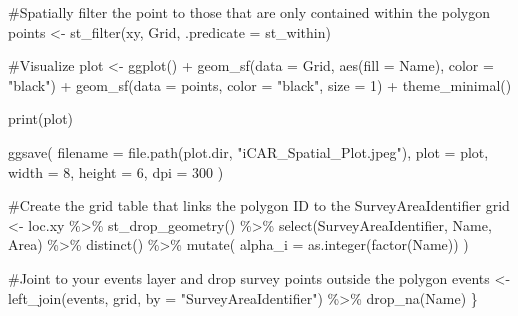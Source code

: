 \documentclass[
  letterpaper,
  DIV=11,
  numbers=noendperiod]{scrreprt}
\newenvironment{Shaded}{\begin{snugshade}}{\end{snugshade}}
\newcommand{\AttributeTok}[1]{\textcolor[rgb]{0.40,0.45,0.13}{#1}}
\newcommand{\CommentTok}[1]{\textcolor[rgb]{0.37,0.37,0.37}{#1}}
\newcommand{\DecValTok}[1]{\textcolor[rgb]{0.68,0.00,0.00}{#1}}
\newcommand{\FunctionTok}[1]{\textcolor[rgb]{0.28,0.35,0.67}{#1}}
\newcommand{\NormalTok}[1]{\textcolor[rgb]{0.00,0.23,0.31}{#1}}
\newcommand{\OtherTok}[1]{\textcolor[rgb]{0.00,0.23,0.31}{#1}}
\newcommand{\SpecialCharTok}[1]{\textcolor[rgb]{0.37,0.37,0.37}{#1}}
\newcommand{\StringTok}[1]{\textcolor[rgb]{0.13,0.47,0.30}{#1}}
\begin{document}
\begin{Shaded}
\begin{Highlighting}[]
\CommentTok{\#Spatially filter the point to those that are only contained within the polygon}
\NormalTok{points }\OtherTok{\textless{}{-}} \FunctionTok{st\_filter}\NormalTok{(xy, Grid, }\AttributeTok{.predicate =}\NormalTok{ st\_within)}

\CommentTok{\#Visualize}
\NormalTok{plot }\OtherTok{\textless{}{-}} \FunctionTok{ggplot}\NormalTok{() }\SpecialCharTok{+}
  \FunctionTok{geom\_sf}\NormalTok{(}\AttributeTok{data =}\NormalTok{ Grid, }\FunctionTok{aes}\NormalTok{(}\AttributeTok{fill =}\NormalTok{ Name), }\AttributeTok{color =} \StringTok{"black"}\NormalTok{) }\SpecialCharTok{+}
  \FunctionTok{geom\_sf}\NormalTok{(}\AttributeTok{data =}\NormalTok{ points, }\AttributeTok{color =} \StringTok{"black"}\NormalTok{, }\AttributeTok{size =} \DecValTok{1}\NormalTok{) }\SpecialCharTok{+}
  \FunctionTok{theme\_minimal}\NormalTok{()}

\FunctionTok{print}\NormalTok{(plot)}

\FunctionTok{ggsave}\NormalTok{(}
  \AttributeTok{filename =} \FunctionTok{file.path}\NormalTok{(plot.dir, }\StringTok{"iCAR\_Spatial\_Plot.jpeg"}\NormalTok{),}
  \AttributeTok{plot =}\NormalTok{ plot,}
  \AttributeTok{width =} \DecValTok{8}\NormalTok{,}
  \AttributeTok{height =} \DecValTok{6}\NormalTok{,}
  \AttributeTok{dpi =} \DecValTok{300}
\NormalTok{)}

\CommentTok{\#Create the grid table that links the polygon ID to the SurveyAreaIdentifier}
\NormalTok{grid }\OtherTok{\textless{}{-}}\NormalTok{ loc.xy }\SpecialCharTok{\%\textgreater{}\%}
  \FunctionTok{st\_drop\_geometry}\NormalTok{() }\SpecialCharTok{\%\textgreater{}\%}
  \FunctionTok{select}\NormalTok{(SurveyAreaIdentifier, Name, Area) }\SpecialCharTok{\%\textgreater{}\%}
  \FunctionTok{distinct}\NormalTok{() }\SpecialCharTok{\%\textgreater{}\%}
  \FunctionTok{mutate}\NormalTok{(}
    \AttributeTok{alpha\_i =} \FunctionTok{as.integer}\NormalTok{(}\FunctionTok{factor}\NormalTok{(Name))}
\NormalTok{  )}

\CommentTok{\#Joint to your events layer and drop survey points outside the polygon}
\NormalTok{events }\OtherTok{\textless{}{-}} \FunctionTok{left\_join}\NormalTok{(events, grid, }\AttributeTok{by =} \StringTok{"SurveyAreaIdentifier"}\NormalTok{) }\SpecialCharTok{\%\textgreater{}\%} \FunctionTok{drop\_na}\NormalTok{(Name)}
\NormalTok{\}}
\end{Highlighting}
\end{Shaded}
\end{document}
